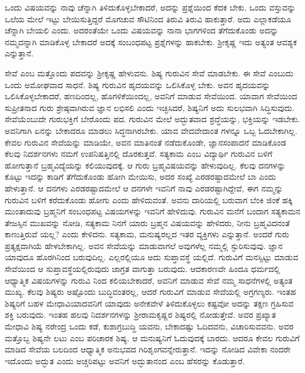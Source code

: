 ಒಂದು ವಿಷಯವನ್ನು ನಾವು ಚೆನ್ನಾಗಿ ತಿಳಿದುಕೊಳ್ಳಬೇಕಾದರೆ, ಅದನ್ನು ಪ್ರಶ್ನೆಯಿಂದ ಕೆದಕ ಬೇಕು. ಒಂದು ವಸ್ತುವನ್ನು ಒಲೆಯ ಮೇಲೆ ಇಟ್ಟು ಬೇಯಿಸುತ್ತಿದ್ದರೆ ಮೊಗಚುವ ಸೌಟಿನಿಂದ ತಿರುವಿ ತಿರುವಿ ಹಾಕುತ್ತಾರೆ. ಅದು ಎಲ್ಲಾಕಡೆಯೂ ಚೆನ್ನಾಗಿ ಬೇಯಲಿ ಎಂದು. ಅದರಂತೆಯೇ ಒಂದು ವಿಷಯವನ್ನು ನಾನಾ ಭಾಗಗಳಿಂದ ತೆಗೆದುಕೊಂಡು ಅದನ್ನು ನಮ್ಮದನ್ನಾಗಿ ಮಾಡಿಕೊಳ್ಳ ಬೇಕಾದರೆ ಅದಕ್ಕೆ ಸಂಬಂಧಪಟ್ಟ ಪ್ರಶ್ನೆಗಳನ್ನು ಹಾಕಬೇಕು. ಶ್ರೀಕೃಷ್ಣ ಇದು ಅತ್ಯಂತ ಆವಶ್ಯಕ ಎನ್ನುತ್ತಾನೆ.

ಸೇವೆ ಎಂಬ ಮತ್ತೊಂದು ಪದವನ್ನು ಶ್ರೀಕೃಷ್ಣ ಹೇಳುವನು. ಶಿಷ್ಯ ಗುರುವಿನ ಸೇವೆ ಮಾಡಬೇಕು. ಈ ಸೇವೆ ಎಂಬುದು ಒಂದು ಅಮೋಘವಾದ ಸಾಧನೆ. ಶಿಷ್ಯ ಗುರುವಿನ ಹೃದಯವನ್ನು ಒಲಿಸಿಕೊಳ್ಳ ಬೇಕು. ಅವನ ಹೃದಯವನ್ನು ಒಲಿಸಿಕೊಳ್ಳಬೇಕಾದರೆ, ಹಣದಿಂದಲ್ಲ, ಹೊಗಳಿಕೆಯಿಂದಲ್ಲ, ಅವನಿಗೆ ಮಾಡುವ ಸೇವೆಯಿಂದ. ಯಾವಾಗ ಸೇವೆಯಿಂದ ಸುಪ್ರೀತನಾದ ಗುರು ಶ್ರೇಷ್ಠವಾಗಿರುವ ಜ್ಞಾನ ಲಭಿಸಲಿ ಎಂದು ಇಚ್ಛಿಸಿದರೆ, ಶಿಷ್ಯನಿಗೆ ಅದು ಸುಲಭವಾಗಿ ಸಿದ್ಧಿಸುವುದು. ಸೇವೆಯೆಂಬುದೇ ಗುರುಭಕ್ತಿಗೆ ಬೇರೊಂದು ಪದ. ಗುರುವಿನ ಮೇಲೆ ಅದ್ಭುತವಾದ ಶ್ರದ್ಧೆಯನ್ನು, ಭಕ್ತಿಯನ್ನು ಇಡಬೇಕು. ಅವನಿಗಾಗಿ ಏನನ್ನು ಬೇಕಾದರೂ ಮಾಡಲು ಸಿದ್ಧನಾಗಿರಬೇಕು. ಯಾವ ವೇದವೇದಾಂತ ಗಳನ್ನೂ ಒಬ್ಬ ಓದಬೇಕಾಗಿಲ್ಲ. ಕೇವಲ ಗುರುವಿನ ಸೇವೆಯನ್ನು ಮಾಡಿಯೇ, ಅವನ ಮಾತಿನಂತೆ ನಡೆದುಕೊಂಡೇ, ಜ್ಞಾನಸಂಪಾದನೆ ಮಾಡಿಕೊಂಡ ಕೆಲವು ನಿದರ್ಶನಗಳು ನಮಗೆ ಉಪನಿಷತ್ತಿನಲ್ಲಿ ದೊರಕುತ್ತವೆ. ಸತ್ಯಕಾಮ ಎಂಬ ವಿದ್ಯಾರ್ಥಿ ಗುರುವಿನ ಬಳಿಗೆ ಹೋಗುತ್ತಾನೆ ಬ್ರಹ್ಮವಿದ್ಯೆಯನ್ನು ಕಲಿಯುವುದಕ್ಕೆ. ಆ ಗುರು ಬ್ರಹ್ಮವಿಷಯವನ್ನು ಹೇಳುವುದಿಲ್ಲ. ಕೆಲವು ದನಗಳನ್ನು ಕೊಟ್ಟು ಇದನ್ನು ಕಾಡಿಗೆ ತೆಗೆದುಕೊಂಡು ಹೋಗಿ ಮೇಯಿಸು, ಅದರ ಸಂಖ್ಯೆ ಎರಡರಷ್ಟಾದಮೇಲೆ ಬಾ ಎಂದು ಹೇಳುತ್ತಾನೆ. ಆ ದನಗಳು ಎರಡರಷ್ಟಾದಮೇಲೆ ಆ ದನಗಳೇ ಇವನಿಗೆ ನಾವು ಎರಡರಷ್ಟಾಗಿದ್ದೇವೆ, ಈಗ ನಮ್ಮನ್ನು ಗುರುವಿನ ಬಳಿಗೆ ಕರೆದುಕೊಂಡು ಹೋಗು ಎಂದು ಹೇಳಿದುವಂತೆ. ಅವನು ದಾರಿಯಲ್ಲಿ ಬರುವಾಗ ಬೆಂಕಿ ಜಿಂಕೆ ಹಕ್ಕಿ ಮುಂತಾದುವು ಬ್ರಹ್ಮನಿಗೆ ಸಂಬಂಧಪಟ್ಟ ವಿಷಯಗಳನ್ನು ಇವನಿಗೆ ಹೇಳಿದುವು. ಗುರುವಿನ ಮನೆಗೆ ಬಂದಾಗ ಸತ್ಯಕಾಮನ ತೇಜಸ್ಸಿನ ಮುಖವನ್ನು ನೋಡಿ, ಸತ್ಯಕಾಮ ನಿನಗೆ ಯಾರು ಬ್ರಹ್ಮನ ವಿಷಯವನ್ನು ಹೇಳಿದರು, ನೀನು ಬ್ರಹ್ಮವಿದನಂತೆ ಕಾಣುತ್ತಿರುವೆ ಯಲ್ಲ? ಎಂದು ಕೇಳಿದನು. ಸತ್ಯಕಾಮ, ಮನುಷ್ಯರಲ್ಲದ ಇತರ ವ್ಯಕ್ತಿಗಳು ಎನ್ನುತ್ತಾನೆ. ಅಂದರೆ ಗುರು ಪ್ರತ್ಯಕ್ಷವಾಗಿಯೆ ಹೇಳಬೇಕಾಗಿಲ್ಲ. ಅವನ ಸೇವೆಯನ್ನು ಮಾಡುವಾಗಲೆ ಅವುಗಳೆಲ್ಲ ನಮ್ಮಲ್ಲಿ ಸ್ಫುರಿಸುವುವು. ಜ್ಞಾನ ಯಾವುದೂ ಹೊರಗಿನಿಂದ ಬರುವುದಿಲ್ಲ. ಎಲ್ಲರಲ್ಲಿಯೂ ಅದು ಸುಪ್ತಾವಸ್ಥೆ ಯಲ್ಲಿದೆ. ಗುರುವಿಗೆ ಮನಸ್ಸಿಟ್ಟು ಮಾಡುವ ಸೇವೆಯಿಂದ ಆ ಸುಪ್ತಾವಸ್ಥೆಯಲ್ಲಿರುವುದು ಜಾಗ್ರತ ವಾಗುತ್ತಾ ಬರುವುದು. ಆದಕಾರಣವೇ ಹಿಂದೂ ಧರ್ಮದಲ್ಲಿ ಆಧ್ಯಾತ್ಮಿಕ ವಿಷಯಗಳನ್ನು ಗುರುವಿ ನಿಂದ ಕಲಿಯಬೇಕಾದರೆ, ಅವನಿಗೆ ಮಾಡುವ ಸೇವೆ ನಮ್ಮ ಸಾಧನೆಗಳಲ್ಲಿ ಅತ್ಯಂತ ಮುಖ್ಯ. ಕೆಲವು ಶಿಷ್ಯರು ಅಷ್ಟೊಂದು ಬುದ್ಧಿವಂತರಲ್ಲ, ಆದರೆ ಗುರುವಿಗೆ ಮಾಡುವ ಸೇವೆಯಲ್ಲಿ ಅಗ್ರಗಣ್ಯರು. ಇಂತಹ ಶಿಷ್ಯರಿಗೆ ಬಹಳ ಮೇಧಾವಿಯಾದವನಿಗೆ ಯಾವುದು ಅನೇಕವೇಳೆ ತಿಳಿದುಕೊಳ್ಳಲು ಕಷ್ಟವೋ ಅದನ್ನು ತಕ್ಷಣ ಗ್ರಹಿಸುವ ಶಕ್ತಿ ಬರುವುದು. ಇಂತಹ ಹಲವು ನಿದರ್ಶನಗಳನ್ನು ಶ್ರೀರಾಮಕೃಷ್ಣರ ಶಿಷ್ಯರಲ್ಲಿ ನೋಡುತ್ತೇವೆ. ಅವರ ಪ್ರಖ್ಯಾತ ಮೇಧಾವಿ ಶಿಷ್ಯ ನರೇಂದ್ರ ಒಂದು ಕಡೆ, ಕುಶಾಗ್ರಬುದ್ಧಿ ಯವನು, ಬೇಕಾದಷ್ಟು ಓದಿದವನು, ವಿಚಾರಿಸುವವನು. ಅವರ ಮತ್ತೊಬ್ಬ ಶಿಷ್ಯನೇ ಲಟು ಎಂಬ ಪರಿಚಾರಕ ಶಿಷ್ಯ. ಆ ಮನುಷ್ಯನಿಗೆ ಓದುವುದಕ್ಕೆ ಬಾರದು. ಆದರೂ ಕೇವಲ ಗುರುವಿಗೆ ಮಾಡಿದ ಸೇವೆಯ ಬಲದಿಂದ ಆಧ್ಯಾತ್ಮಿಕ ಅನುಭವದ ಗಿರಿಶೃಂಗವನ್ನೇರುತ್ತಾನೆ. ಇದನ್ನು ನೋಡಿದ ವಿವೇಕಾ ನಂದರೇ ಇದೊಂದು ಅದ್ಭುತ ಎಂದು ಅಚ್ಚರಿಪಟ್ಟು ಅವನಿಗೆ ಅದ್ಭುತಾನಂದ ಎಂಬ ಹೆಸರನ್ನು ಕೊಡುತ್ತಾರೆ.

